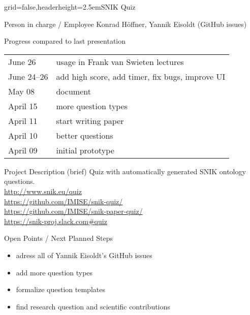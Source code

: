 \documentclass[]{kiesgrube}
\begin{document}
\begin{poster}%
{grid=false,headerheight=2.5em}{}{SNIK Quiz}{}

\begin{posterbox}[name=person,column=0,row=0]{Person in charge / Employee}
Konrad Höffner, Yannik Eisoldt (GitHub issues) 
\end{posterbox}
\begin{posterbox}[name=progress,below=person]{Progress compared to last presentation}
\begin{tabular}{ll}
June 26		&usage in Frank van Swieten lectures\\
June 24--26	&add high score, add timer, fix bugs, improve UI\\
May 08		&document\\
April 15	&more question types\\
April 11	&start writing paper\\
April 10	&better questions\\
April 09	&initial prototype\\
\end{tabular}
\end{posterbox}
\begin{posterbox}[name=description,below=progress]{Project Description (brief)}
Quiz with automatically generated SNIK ontology questions.\\
\url{http://www.snik.eu/quiz}\\
\url{https://github.com/IMISE/snik-quiz/}\\
\url{https://github.com/IMISE/snik-paper-quiz/}\\
\url{https://snik-proj.slack.com#quiz}
\end{posterbox}
\begin{posterbox}[name=open,column=1,row=0]{Open Points / Next Planned Steps}
\begin{itemize}
\item adress all of Yannik Eisoldt's GitHub issues
\item add more question types
\item formalize question templates
\item find research question and scientific contributions

\end{itemize}
\end{posterbox}
\end{poster}
\end{document}
